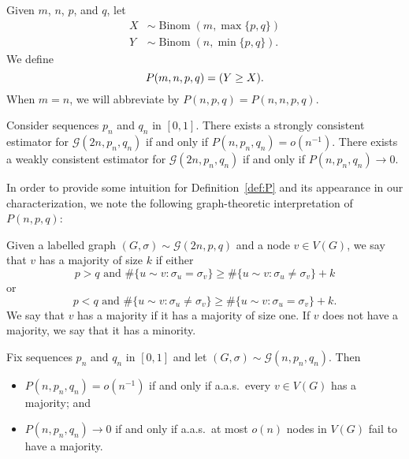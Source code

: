 \documentclass[EJP,final]{ejpecp}
\newcommand{\1}[1]{\mathbbm{1}_{\{#1\}}}
\newcommand{\calG}{\mathcal{G}}
\let\Pr\relax
\DeclareMathOperator{\Pr}{Pr}
\DeclareMathOperator{\Binom}{Binom}
\begin{document}
\begin{definition}\label{def:P}
 Given $m$, $n$, $p$, and $q$, let
 \begin{align*}
   X &\sim \Binom(m, \max\{p,q\}) \\
   Y &\sim \Binom(n, \min\{p,q\}).
 \end{align*}
 We define
 \[
  P(m, n, p, q) = \Pr(Y \ge X).
 \]
 When $m = n$, we will abbreviate by $P(n, p, q) = P(n, n, p, q)$.
\end{definition}

\begin{theorem}\label{thm:consistency}
 Consider sequences $p_n$ and $q_n$ in $[0, 1]$.
 There exists a strongly consistent estimator for
 $\calG(2n, p_n, q_n)$ if and only if $P(n, p_n, q_n) = o(n^{-1})$.
 There exists a weakly consistent estimator for
 $\calG(2n, p_n, q_n)$ if and only if $P(n, p_n, q_n) \to 0$.
\end{theorem}

In order to provide some intuition for Definition~\ref{def:P} and
its appearance in our characterization, we note the following graph-theoretic
interpretation of $P(n, p, q)$:

\begin{definition}\label{def:majority}
 Given a labelled graph $(G, \sigma) \sim \calG(2n, p, q)$ and a node
 $v \in V(G)$, we say that $v$ has a majority of size $k$ if either
 \[
  p > q \text{ and }
  \#\{u \sim v: \sigma_u = \sigma_v\} \ge \#\{u \sim v: \sigma_u \ne \sigma_v\} + k
 \]
 or
 \[
  p < q \text{ and }
  \#\{u \sim v: \sigma_u \ne \sigma_v\} \ge \#\{u \sim v: \sigma_u = \sigma_v\} + k.
 \]
 We say that $v$ has a majority if it has a majority of size one.
 If $v$ does not have a majority, we say that it has a minority.
\end{definition}

\begin{proposition}\label{prop:majorities}
 Fix sequences $p_n$ and $q_n$ in $[0, 1]$ and let $(G, \sigma) \sim
 \calG(n, p_n, q_n)$. Then
 \begin{itemize}
 \item $P(n, p_n, q_n) = o(n^{-1})$ if and only if
 a.a.s.\ every $v \in V(G)$ has a majority; and
 \item $P(n, p_n, q_n) \to 0$ if and only if
 a.a.s.\ at most $o(n)$ nodes in $V(G)$ fail to have a majority.
 \end{itemize}
\end{proposition}
\end{document}
